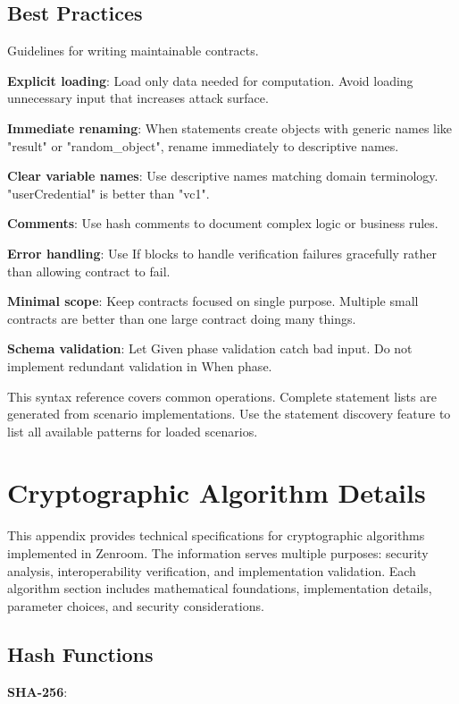 \subsection{Best Practices}

Guidelines for writing maintainable contracts.

\textbf{Explicit loading}: Load only data needed for
computation. Avoid loading unnecessary input that increases attack
surface.

\textbf{Immediate renaming}: When statements create objects with
generic names like "result" or "random\_object", rename immediately to
descriptive names.

\textbf{Clear variable names}: Use descriptive names matching domain
terminology. "userCredential" is better than "vc1".

\textbf{Comments}: Use hash comments to document complex logic or
business rules.

\textbf{Error handling}: Use If blocks to handle verification failures
gracefully rather than allowing contract to fail.

\textbf{Minimal scope}: Keep contracts focused on single
purpose. Multiple small contracts are better than one large contract
doing many things.

\textbf{Schema validation}: Let Given phase validation catch bad
input. Do not implement redundant validation in When phase.

This syntax reference covers common operations. Complete statement
lists are generated from scenario implementations. Use the statement
discovery feature to list all available patterns for loaded scenarios.

\section{Cryptographic Algorithm Details}

This appendix provides technical specifications for cryptographic
algorithms implemented in Zenroom. The information serves multiple
purposes: security analysis, interoperability verification, and
implementation validation. Each algorithm section includes
mathematical foundations, implementation details, parameter choices,
and security considerations.

\subsection{Hash Functions}

\textbf{SHA-256}:

